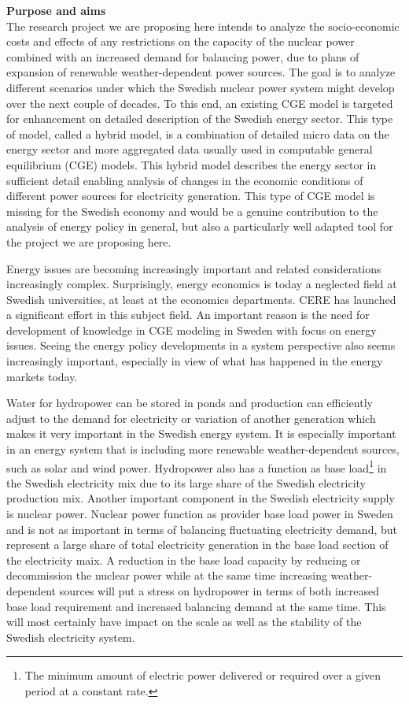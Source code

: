 \textbf{Purpose and aims}\\
The research project we are proposing here intends to analyze the socio-economic costs and effects of any restrictions on the capacity of the nuclear power combined with an increased demand for balancing power, due to plans of expansion of renewable weather-dependent power sources. The goal is to analyze different scenarios under which the Swedish nuclear power system might develop over the next couple of decades. To this end, an existing CGE model is targeted for enhancement on detailed description of the Swedish energy sector. This type of model, called a hybrid model, is a combination of detailed micro data on the energy sector and more aggregated data usually used in computable general equilibrium (CGE) models. This hybrid model describes the energy sector in sufficient detail enabling analysis of changes in the economic conditions of different power sources for electricity generation. This type of CGE model is missing for the Swedish economy and would be a genuine contribution to the analysis of energy policy in general, but also a particularly well adapted tool for the project we are proposing here.

Energy issues are becoming increasingly important and related considerations increasingly complex. Surprisingly, energy economics is today a neglected field at Swedish universities, at least at the economics departments. CERE has launched a significant effort in this subject field. An important reason is the need for development of knowledge in CGE modeling in Sweden with focus on energy issues. Seeing the energy policy developments in a system perspective also seems increasingly important, especially in view of what has happened in the energy markets today.

Water for hydropower can be stored in ponds and production can efficiently adjust to the demand for electricity or variation of another generation which makes it very important in the Swedish energy system. It is especially important in an energy system that is including more renewable weather-dependent sources, such as solar and wind power. Hydropower also has a function as base load\footnote{The minimum amount of electric power delivered or required over a given period at a constant rate.} in the Swedish electricity mix due to its large share of the Swedish electricity production mix. Another important component in the Swedish electricity supply is nuclear power. Nuclear power function as provider base load power in Sweden and is not as important in terms of balancing fluctuating electricity demand, but represent a large share of total electricity generation in the base load section of the electricity maix. A reduction in the base load capacity by reducing or decommission the nuclear power while at the same time increasing weather-dependent sources will put a stress on hydropower in terms of both increased base load requirement and increased balancing demand at the same time. This will most certainly have impact on the scale as well as the stability of the Swedish electricity system.

